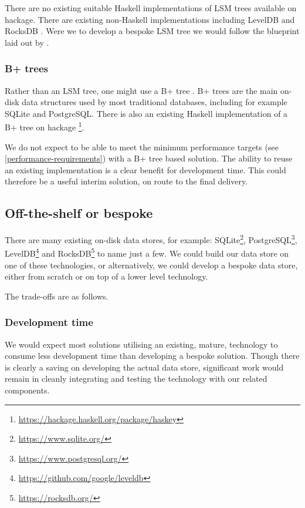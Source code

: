 \documentclass[11pt,a4paper]{article}
\begin{document}
There are no existing suitable Haskell implementations of LSM trees available
on hackage. There are existing non-Haskell implementations including LevelDB
and RocksDB . Were we to develop a bespoke LSM tree we would follow the
blueprint laid out by \cite{monkey}.

\subsubsection{B+ trees}
Rather than an LSM tree, one might use a B+ tree \citep{journals/csur/Comer79}.
B+ trees are the main on-disk data structures used by most traditional
databases, including for example SQLite and PostgreSQL. There is also an
existing Haskell implementation of a B+ tree on hackage%
\footnote{\url{https://hackage.haskell.org/package/haskey}}.

We do not expect to be able to meet the minimum performance targets (see 
\cref{performance-requirements}) with a B+ tree based solution. The ability to
reuse an existing implementation is a clear benefit for development time. This
could therefore be a useful interim solution, on route to the final delivery.

\subsection{Off-the-shelf or bespoke}

There are many existing on-disk data stores, for example:
SQLite\footnote{\url{https://www.sqlite.org/}},
PostgreSQL\footnote{\url{https://www.postgresql.org/}},
LevelDB\footnote{\url{https://github.com/google/leveldb}}
and RocksDB\footnote{\url{https://rocksdb.org/}} to name just a few.
We could build our data store on one of these technologies, or alternatively,
we could develop a bespoke data store, either from scratch or on top of a lower
level technology.

The trade-offs are as follows.

\subsubsection{Development time}

We would expect most solutions utilising an existing, mature, technology to
consume less development time than developing a bespoke solution. Though there
is clearly a saving on developing the actual data store, significant work would
remain in cleanly integrating and testing the technology with our related
components.
\end{document}
